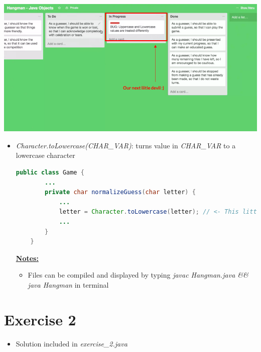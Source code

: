 \documentclass[12pt]{article}
\begin{document}
\begin{center}
\includegraphics[width=\linewidth]{images/part_4_notes_2.png}
\end{center}

\begin{itemize}
    \item \textit{Character.toLowercase(CHAR\_VAR)}: turns value in \textit{CHAR\_VAR}
    to a lowercase character


    \begin{lstlisting}[language=Java,caption={lesson\_02/Game.java}]
    public class Game {
        ...
        private char normalizeGuess(char letter) {
            ...
            letter = Character.toLowercase(letter); // <- This little guy here :)
            ...
        }
    }
    \end{lstlisting}

    \bigskip

    \underline{\textbf{Notes:}}

    \bigskip

    \begin{itemize}
        \item Files can be compiled and displayed by typing \textit{javac Hangman.java \&\& java Hangman}
        in terminal
    \end{itemize}
\end{itemize}

\bigskip

\section{Exercise 2}

\bigskip

\begin{itemize}
    \item Solution included in \textit{exercise\_2.java}
\end{itemize}
\end{document}
